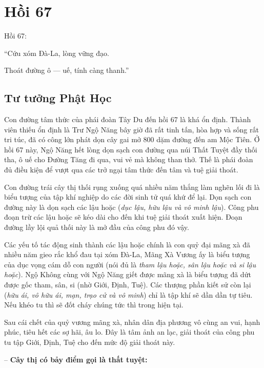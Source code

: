\chapter{Hồi 67} %
\label{cha:hoi_67}

Hồi 67:

\begin{itshape}
``Cứu xóm Đà-La, lòng vững đạo.

Thoát đường ô --- uế, tính càng thanh.''
\end{itshape}

\section{Tư tưởng Phật Học} %
\label{sec:67_phat_hoc}

Con đường tâm thức của phái đoàn Tây Du đến hồi 67 là khá ổn định. Thành viên thiếu ổn định là Trư Ngộ Năng bây giờ đã rất tinh tấn, hòa hợp và sống rất tri túc, đã có công lớn phát dọn cây gai mở 800 dặm đường đến am Mộc Tiên. Ở hồi 67 này, Ngộ Năng hết lòng dọn sạch con đường qua núi Thất Tuyệt đầy thối tha, ô uế cho Đường Tăng đi qua, vui vẻ mà không than thở. Thế là phái đoàn đủ điều kiện để vượt qua các trở ngại tâm thức đến tâm và tuệ giải thoát.

Con đường trái cây thị thối rụng xuống quá nhiều năm thắng làm nghẽn lối đi là biểu tượng của tập khí nghiệp do các đời sinh tử quá khứ để lại. Dọn sạch con đường này là dọn sạch các lậu hoặc (\emph{dục lậu, hữu lậu và vô minh lậu}). Công phu đoạn trừ các lậu hoặc sẽ kéo dài cho đến khi tuệ giải thoát xuất hiện. Đoạn đường lầy lội quả thối này là mở đầu của công phu đó vậy.

Các yếu tố tác động sinh thành các lậu hoặc chính là con quỷ đại mãng xà đã nhiều năm gieo rắc khổ đau tại xóm Đà-La, Mãng Xà Vương ấy là biểu tượng của dục vọng cám dỗ con người (nói đủ là \emph{tham lậu hoặc, sân lậu hoặc và si lậu hoặc}). Ngộ Không cùng với Ngộ Năng giết được mãng xà là biểu tượng đã dứt được gốc tham, sân, si (nhờ Giới, Định, Tuệ). Các thượng phần kiết sử còn lại (\emph{hữu ái, vô hữu ái, mạn, trạo cử và vô minh}) chỉ là tập khí sẽ dần dần tự tiêu. Nếu khéo tu thì sẽ đốt cháy chúng tức thì trong hiện tại.

Sau cái chết của quỷ vương mãng xà, nhân dân địa phương vô cùng an vui, hạnh phúc, tiêu hết các sợ hãi, âu lo. Đây là tâm ảnh an lạc, giải thoát của công phu tu tập Giới, Định, Tuệ cho đến mức độ giải thoát này.

-- {\bf Cây thị có bảy điểm gọi là thất tuyệt:}

